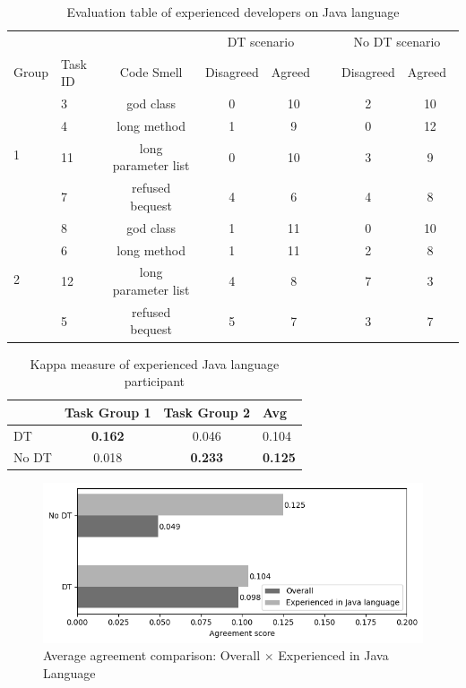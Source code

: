 \begin{table}[ht]
\centering
\begin{tabular}{llccclcc} 
\toprule
 &  & \multicolumn{1}{l}{} & \multicolumn{2}{c}{DT scenario} & \multicolumn{1}{c}{} & \multicolumn{2}{c}{No DT scenario} \\ 
\cmidrule{4-5}\cmidrule{7-8}
Group & Task ID & Code Smell & Disagreed & Agreed~ &  & \multicolumn{1}{l}{Disagreed} & \multicolumn{1}{l}{Agreed~} \\ 
\midrule
\multirow{4}{*}{1} & 3 & god class & 0 & 10 &  & 2 & 10 \\
 & 4 & long method & 1 & 9 &  & 0 & 12 \\
 & 11 & long parameter list & 0 & 10 &  & 3 & 9 \\
 & 7 & refused bequest & 4 & 6 &  & 4 & 8 \\ 
\midrule
\multirow{4}{*}{2} & 8 & god class & 1 & 11 &  & 0 & 10 \\
 & 6 & long method & 1 & 11 &  & 2 & 8 \\
 & 12 & long parameter list & 4 & 8 &  & 7 & 3 \\
 & 5 & refused bequest & 5 & 7 &  & 3 & 7 \\
\bottomrule
\end{tabular}
\caption{Evaluation table of experienced developers on Java language}
\label{tbl:javaLanguageTableEvaluation}
\end{table}

\begin{table}[ht]
\centering
\setlength{\extrarowheight}{0pt}
\addtolength{\extrarowheight}{\aboverulesep}
\addtolength{\extrarowheight}{\belowrulesep}
\setlength{\aboverulesep}{0pt}
\setlength{\belowrulesep}{0pt}
\begin{tabular}{lccl} 
\toprule
 & \multicolumn{1}{l}{Task Group 1} & \multicolumn{1}{l}{Task Group 2} & {\cellcolor[rgb]{0.753,0.753,0.753}}\textbf{Avg} \\ 
\midrule
DT & \textbf{0.162} & 0.046 & {\cellcolor[rgb]{0.753,0.753,0.753}}0.104 \\
No DT & 0.018 & \textbf{0.233} & {\cellcolor[rgb]{0.753,0.753,0.753}}\textbf{0.125} \\
\bottomrule
\end{tabular}
\caption{Kappa measure of experienced Java language participant}
\label{tbl:JavaLanguageKappaValues}
\end{table}

\begin{figure}[!ht]
\centering
\includegraphics[width=15cm]{figures/overallXjava.png}
\caption{Average agreement comparison: Overall $\times$ Experienced in Java Language}
\label{fig:overallxjavaLanguage}
\end{figure}

